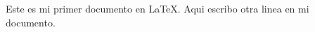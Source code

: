 \documentclass{article}
\begin{document}
 Este es mi primer documento en \LaTeX.
 Aqui escribo otra linea en mi documento.
 
\end{document}

